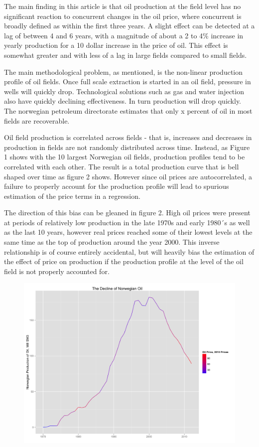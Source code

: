 \documentclass[12pt]{scrartcl} %
\begin{document}
The main finding in this article is that oil production at the field level has no significant reaction to concurrent changes in the oil price, where concurrent is broadly defined as within the first three years.  A slight effect can be detected at a lag of between 4 and 6 years, with a magnitude of about a 2 to 4\% increase in yearly production for a 10 dollar increase in the price of oil.  This effect is somewhat greater and with less of a lag in large fields compared to small fields.

The main methodological problem, as mentioned, is the non-linear production profile of oil fields.  Once full scale extraction is started in an oil field, pressure in wells will quickly drop.  Technological solutions such as gas and water injection also have quickly declining effectiveness.  In turn production will drop quickly.  The norwegian petroleum directorate estimates that only x percent of oil in most fields are recoverable. 

Oil field production is correlated across fields - that is, increases and decreases in production in fields are not randomly distributed across time.  Instead, as Figure 1 shows with the 10 largest Norwegian oil fields, production profiles tend to be correlated with each other.  The result is a total production curve that is bell shaped over time as figure 2 shows.  However since oil prices are autocorrelated, a failure to properly account for the production profile will lead to spurious estimation of the price terms in a regression.  

The direction of this bias can be gleaned in figure 2.  High oil prices were present at periods of relatively low production in the late 1970s and early 1980´s as well as the last 10 years, however real prices reached some of their lowest levels at the same time as the top of production around the year 2000.  This inverse relationship is of course entirely accidental, but will heavily bias the estimation of the effect of price on production if the production profile at the level of the oil field is not properly accounted for.  

\begin{figure}
	\includegraphics[width=1\textwidth]{oil_decline.png}
\end{figure}
\end{document}
